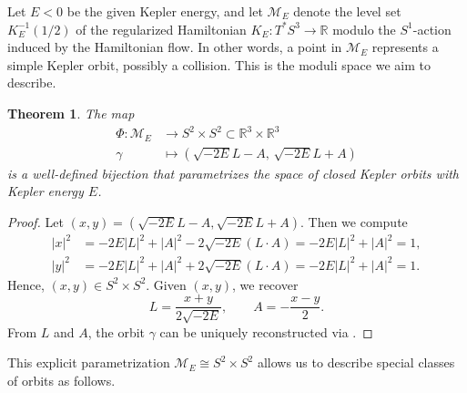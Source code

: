 \documentclass{amsart}
\newcommand{\R}{\mathbb{R}}
\newtheorem{thm}{Theorem}[section]
\begin{document}
Let $E < 0$ be the given Kepler energy, and let $\mathcal{M}_E$ denote the level set $K_E^{-1}(1/2)$ of the regularized Hamiltonian $K_E : T^*S^3 \to \mathbb{R}$ modulo the $S^1$-action induced by the Hamiltonian flow.
In other words, a point in $\mathcal{M}_E$ represents a simple Kepler orbit, possibly a collision.
This is the moduli space we aim to describe.

\begin{thm}\label{Theorem - Moduli parametrization}
	The map
	$$
	\begin{aligned}
		\Phi: \mathcal{M}_E &\to S^2 \times S^2 \subset \R^3\times \R^3 \\
		\gamma &\mapsto \left( \sqrt{-2E} L - A, \, \sqrt{-2E} L + A \right)
	\end{aligned}
	$$
	is a well-defined bijection that parametrizes the space of closed Kepler orbits with Kepler energy $E$.
\end{thm}

\begin{proof}
	Let $(x, y) = \left( \sqrt{-2E}L - A, \sqrt{-2E}L + A \right)$.
	Then we compute
	$$
	\begin{aligned}
		|x|^2 &= -2E|L|^2 + |A|^2 - 2\sqrt{-2E} (L\cdot A)  = -2E|L|^2 + |A|^2 = 1, \\
		|y|^2 &= -2E|L|^2 + |A|^2 + 2\sqrt{-2E} (L \cdot A) = -2E|L|^2 + |A|^2 = 1.
	\end{aligned}
	$$
	Hence, $(x, y) \in S^2 \times S^2$.
	Given $(x, y)$, we recover
	$$
	L = \frac{x + y}{2\sqrt{-2E}}, \qquad A = -\frac{x - y}{2}.
	$$
	From $L$ and $A$, the orbit $\gamma$ can be uniquely reconstructed via .
\end{proof}

This explicit parametrization $\mathcal{M}_E \cong S^2 \times S^2$ allows us to describe special classes of orbits as follows.
\end{document}

